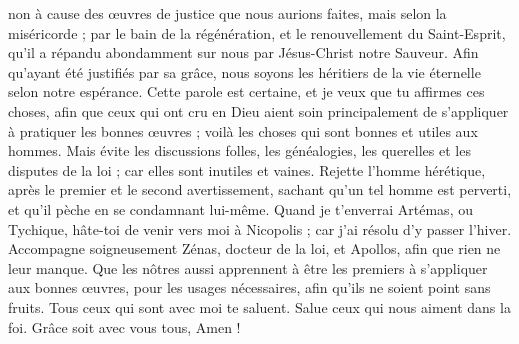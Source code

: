 \begin{multicols}{2}
non à cause des œuvres de justice que nous aurions faites, mais selon la miséricorde ; par le bain de la régénération, et le renouvellement du Saint-Esprit,
qu’il a répandu abondamment sur nous par Jésus-Christ notre Sauveur.
Afin qu'ayant été justifiés par sa grâce, nous soyons les héritiers de la vie éternelle selon notre espérance.
Cette parole est certaine, et je veux que tu affirmes ces choses, afin que ceux qui ont cru en Dieu aient soin principalement de s'appliquer à pratiquer les bonnes œuvres ; voilà les choses qui sont bonnes et utiles aux hommes.
Mais évite les discussions folles, les généalogies, les querelles et les disputes de la loi ; car elles sont inutiles et vaines.
Rejette l'homme hérétique, après le premier et le second avertissement,
sachant qu'un tel homme est perverti, et qu'il pèche en se condamnant lui-même.
\TextTitle{[Conclusion]}
Quand je t’enverrai Artémas, ou Tychique, hâte-toi de venir vers moi à Nicopolis ; car j'ai résolu d'y passer l'hiver.
Accompagne soigneusement Zénas, docteur de la loi, et Apollos, afin que rien ne leur manque.
Que les nôtres aussi apprennent à être les premiers à s'appliquer aux bonnes œuvres, pour les usages nécessaires, afin qu'ils ne soient point sans fruits.
Tous ceux qui sont avec moi te saluent. Salue ceux qui nous aiment dans la foi. Grâce soit avec vous tous, Amen !
\PPE{}
\end{multicols}

